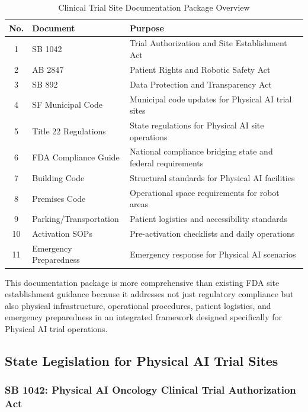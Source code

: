 \begin{table}[H]
\centering
\caption{Clinical Trial Site Documentation Package Overview}
\label{tab:site-docs-overview}
\small
\begin{tabularx}{\textwidth}{c l X}
\toprule
\textbf{No.} & \textbf{Document} & \textbf{Purpose} \\
\midrule
1 & SB 1042 & Trial Authorization and Site Establishment Act \\
2 & AB 2847 & Patient Rights and Robotic Safety Act \\
3 & SB 892 & Data Protection and Transparency Act \\
4 & SF Municipal Code & Municipal code updates for Physical AI trial sites \\
5 & Title 22 Regulations & State regulations for Physical AI site operations \\
6 & FDA Compliance Guide & National compliance bridging state and federal requirements \\
7 & Building Code & Structural standards for Physical AI facilities \\
8 & Premises Code & Operational space requirements for robot areas \\
9 & Parking/Transportation & Patient logistics and accessibility standards \\
10 & Activation SOPs & Pre-activation checklists and daily operations \\
11 & Emergency Preparedness & Emergency response for Physical AI scenarios \\
\bottomrule
\end{tabularx}
\end{table}

This documentation package is more comprehensive than existing FDA site
establishment guidance because it addresses not just regulatory compliance but
also physical infrastructure, operational procedures, patient logistics, and
emergency preparedness in an integrated framework designed specifically for
Physical AI trial operations.

\subsection{State Legislation for Physical AI Trial Sites}
\label{subsec:site-legislation}

\subsubsection{SB 1042: Physical AI Oncology Clinical Trial Authorization Act}

